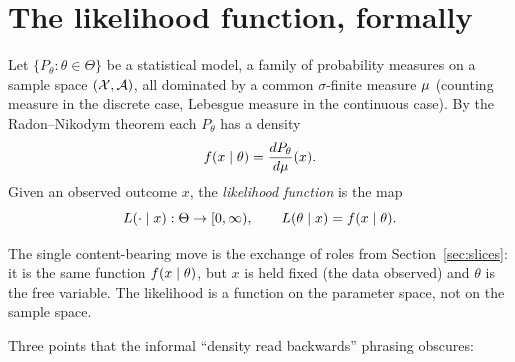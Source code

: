 \section{The likelihood function, formally}
\label{sec:definition}

\begin{definition}
\label{def:likelihood}
Let $\{P_\theta : \theta \in \Theta\}$ be a statistical model, a family of
probability measures on a sample space $(\mathcal{X}, \mathcal{A})$, all dominated by a
common $\sigma$-finite measure $\mu$ (counting measure in the discrete case,
Lebesgue measure in the continuous case). By the Radon--Nikodym theorem each
$P_\theta$ has a density
\begin{equation}
  f(x \mid \theta) = \frac{d P_\theta}{d \mu}(x).
\end{equation}
Given an observed outcome $x$, the \emph{likelihood function} is the map
\begin{equation}
  L(\cdot \mid x) : \Theta \to [0, \infty),
  \qquad
  L(\theta \mid x) = f(x \mid \theta).
\end{equation}
\end{definition}

The single content-bearing move is the exchange of roles from
Section~\ref{sec:slices}: it is the same function $f(x \mid \theta)$, but
$x$ is held fixed (the data observed) and $\theta$ is the free variable. The
likelihood is a function on the parameter space, not on the sample space.

Three points that the informal ``density read backwards'' phrasing obscures:

